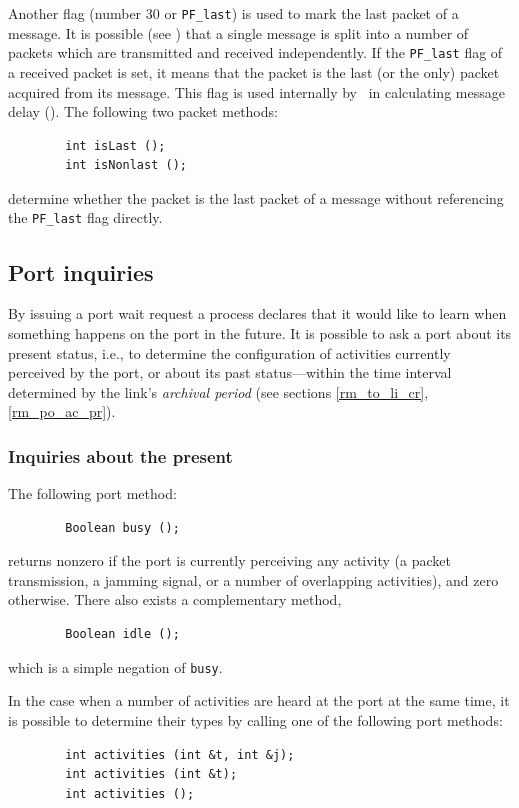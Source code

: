 Another flag (number 30 or {\tt PF\_last}) is used to mark the last packet
of a message.
It is possible (see ) that a single message is split into
a number of packets which are transmitted and received independently.
If the {\tt PF\_last} flag of a received packet is set, it means that the
packet is the last (or the only) packet acquired from its message.
This flag is used internally by \smurph\ in calculating message delay
().
The following two packet methods:
\begin{verbatim}
        int isLast ();
        int isNonlast ();
\end{verbatim}
determine whether the packet is the last packet of a message
without referencing the {\tt PF\_last} flag directly.

\subsection{Port inquiries}
\label{rm_po_in}

By issuing a port wait request a process declares that it would like to learn
when something happens on the port in the future.
It is possible to ask a port about its present status, i.e., to determine
the configuration of activities currently perceived by the port, or
about its past status---within the time interval determined by the
link's {\em archival period\/}
(see sections \ref{rm_to_li_cr}, \ref{rm_po_ac_pr}).

\subsubsection{Inquiries about the present}
\label{rm_po_in_pr}

The following port method:
\begin{verbatim}
        Boolean busy ();
\end{verbatim}
returns nonzero if the port is currently perceiving any activity (a packet
transmission, a jamming signal, or a number of overlapping activities), and
zero otherwise.
There also exists a complementary method,
\begin{verbatim}
        Boolean idle ();
\end{verbatim}
which is a simple negation of {\tt busy}.

In the case when a number of activities are heard at the port at the same time,
it is possible to determine their types by calling one of the following
port methods:
\begin{verbatim}
        int activities (int &t, int &j);
        int activities (int &t);
        int activities ();
\end{verbatim}

